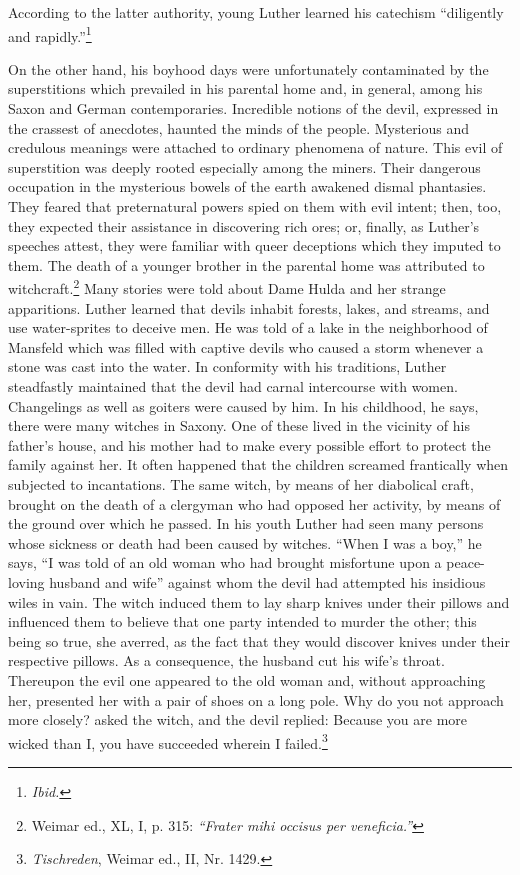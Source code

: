 According to the latter authority, young Luther learned his catechism “diligently and rapidly.”\footnote{\textit{Ibid.}}

On the other hand, his boyhood days were unfortunately contaminated by the superstitions which prevailed in his parental home
and, in general, among his Saxon and German contemporaries. Incredible notions of the devil, expressed in the crassest of anecdotes,
haunted the minds of the people. Mysterious and credulous meanings were attached to ordinary phenomena of nature. This evil of
superstition was deeply rooted especially among the miners. Their
dangerous occupation in the mysterious bowels of the earth awakened
dismal phantasies. They feared that preternatural powers spied on
them with evil intent; then, too, they expected their assistance in
discovering rich ores; or, finally, as Luther’s speeches attest, they were
familiar with queer deceptions which they imputed to them. The
death of a younger brother in the parental home was attributed to
witchcraft.\footnote{Weimar ed., XL, I, p. 315: \textit{“Frater mihi occisus per veneficia.”}}
Many stories were told about Dame Hulda and her
strange apparitions. Luther learned that devils inhabit forests, lakes,
and streams, and use water-sprites to deceive men. He was told of
a lake in the neighborhood of Mansfeld which was filled with
captive devils who caused a storm whenever a stone was cast
into the water. In conformity with his traditions, Luther steadfastly maintained that the devil had carnal intercourse with women.
Changelings as well as goiters were caused by him. In his childhood,
he says, there were many witches in Saxony. One of these lived in
the vicinity of his father’s house, and his mother had to make every
possible effort to protect the family against her. It often happened
that the children screamed frantically when subjected to incantations.
The same witch, by means of her diabolical craft, brought on the
death of a clergyman who had opposed her activity, by means of
the ground over which he passed. In his youth Luther had seen many
persons whose sickness or death had been caused by witches. “When
I was a boy,” he says, “I was told of an old woman who had brought
misfortune upon a peace-loving husband and wife” against whom
the devil had attempted his insidious wiles in vain. The witch induced them to lay sharp knives under their pillows and influenced
them to believe that one party intended to murder the other; this
being so true, she averred, as the fact that they would discover
knives under their respective pillows. As a consequence, the husband
cut his wife’s throat. Thereupon the evil one appeared to the old
woman and, without approaching her, presented her with a pair
of shoes on a long pole. Why do you not approach more closely?
asked the witch, and the devil replied: Because you are more wicked
than I, you have succeeded wherein I failed.\footnote{\textit{Tischreden}, Weimar ed., II, Nr. 1429.}

